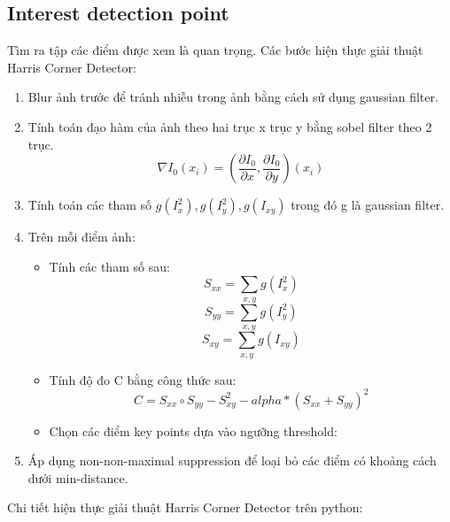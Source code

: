 \documentclass[11pt]{article}
\begin{document}
\subsection*{Interest detection point}
Tìm ra tập các điểm được xem là quan trọng. Các bước hiện thực giải thuật Harris Corner Detector:
\begin{enumerate}
    \item Blur ảnh trước để tránh nhiễu trong ảnh bằng cách sử dụng gaussian filter.
    \item Tính toán đạo hàm của ảnh theo hai trục x trục y bằng sobel filter theo 2 trục.
        \begin{equation*}
            \nabla I_0(x_i) = (\frac{\partial I_0}{\partial x}, \frac{\partial I_0}{\partial y})(x_i)
        \end{equation*}
    \item Tính toán các tham số $g(I_x^2), g(I_y^2), g(I_{xy})$ trong đó g là gaussian filter.
    \item Trên mỗi điểm ảnh:
        \begin{itemize}
            \item Tính các tham số sau:
                \begin{equation*}
                    S_{xx} = \sum_{x, y} g(I_x^2)
                \end{equation*}
                \begin{equation*}
                    S_{yy} = \sum_{x, y} g(I_y^2)
                \end{equation*}
                \begin{equation*}
                    S_{xy} = \sum_{x, y} g(I_{xy})
                \end{equation*}
            \item Tính độ đo C bằng công thức sau:
                \begin{equation*}
                    C = S_{xx} \circ S_{yy} - S_{xy}^2 - alpha*(S_{xx} + S_{yy})^2
                \end{equation*}
            \item Chọn các điểm key points dựa vào ngưỡng threshold:
        \end{itemize}
    \item Áp dụng non-non-maximal suppression để loại bỏ các điểm có khoảng cách dưới min-distance.
\end{enumerate}
Chi tiết hiện thực giải thuật Harris Corner Detector trên python:
\end{document}
